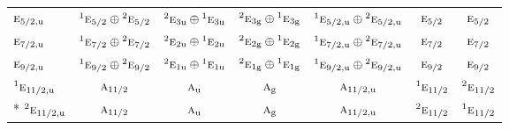 \documentclass[10pt,a4paper]{article}
\numberwithin{equation}{section}
\newcommand{\irr}[1]{\text{\normalfont\scshape #1}}
\newcommand{\conjpair}[1]{{}^{#1}}
\newcommand{\ptag}[1]{\mathrm{#1}}
\begin{document}
{\begin{longtable}{@{}lcccccc@{}}
$\irr{e}_{5/2,\ptag{u}}$ & $\conjpair{1}\irr{e}_{5/2}\oplus \conjpair{2}\irr{e}_{5/2}$ & $\conjpair{2}\irr{e}_{3\ptag{u}}\oplus \conjpair{1}\irr{e}_{3\ptag{u}}$ & $\conjpair{2}\irr{e}_{3\ptag{g}}\oplus \conjpair{1}\irr{e}_{3\ptag{g}}$ & $\conjpair{1}\irr{e}_{5/2,\ptag{u}}\oplus \conjpair{2}\irr{e}_{5/2,\ptag{u}}$ & $\irr{e}_{5/2}$ & $\irr{e}_{5/2}$\\
$\irr{e}_{7/2,\ptag{u}}$ & $\conjpair{1}\irr{e}_{7/2}\oplus \conjpair{2}\irr{e}_{7/2}$ & $\conjpair{2}\irr{e}_{2\ptag{u}}\oplus \conjpair{1}\irr{e}_{2\ptag{u}}$ & $\conjpair{2}\irr{e}_{2\ptag{g}}\oplus \conjpair{1}\irr{e}_{2\ptag{g}}$ & $\conjpair{1}\irr{e}_{7/2,\ptag{u}}\oplus \conjpair{2}\irr{e}_{7/2,\ptag{u}}$ & $\irr{e}_{7/2}$ & $\irr{e}_{7/2}$\\
$\irr{e}_{9/2,\ptag{u}}$ & $\conjpair{1}\irr{e}_{9/2}\oplus \conjpair{2}\irr{e}_{9/2}$ & $\conjpair{2}\irr{e}_{1\ptag{u}}\oplus \conjpair{1}\irr{e}_{1\ptag{u}}$ & $\conjpair{2}\irr{e}_{1\ptag{g}}\oplus \conjpair{1}\irr{e}_{1\ptag{g}}$ & $\conjpair{1}\irr{e}_{9/2,\ptag{u}}\oplus \conjpair{2}\irr{e}_{9/2,\ptag{u}}$ & $\irr{e}_{9/2}$ & $\irr{e}_{9/2}$\\
$\conjpair{1}\irr{e}_{11/2,\ptag{u}}$ & $\irr{a}_{11/2}$ & $\irr{a}_{\ptag{u}}$ & $\irr{a}_{\ptag{g}}$ & $\irr{a}_{11/2,\ptag{u}}$ & $\conjpair{1}\irr{e}_{11/2}$ & $\conjpair{2}\irr{e}_{11/2}$\\*
$\conjpair{2}\irr{e}_{11/2,\ptag{u}}$ & $\irr{a}_{11/2}$ & $\irr{a}_{\ptag{u}}$ & $\irr{a}_{\ptag{g}}$ & $\irr{a}_{11/2,\ptag{u}}$ & $\conjpair{2}\irr{e}_{11/2}$ & $\conjpair{1}\irr{e}_{11/2}$\\
\bottomrule\end{longtable}}
\end{document}
